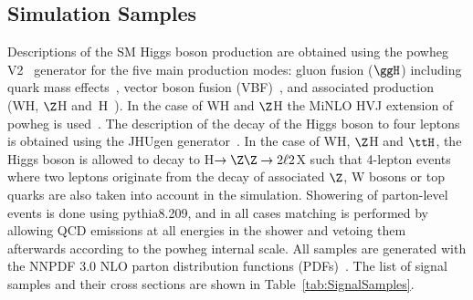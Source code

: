 \subsection{Simulation Samples}
 Descriptions of the SM Higgs boson production are obtained using the {\sc powheg V2}~\cite{Alioli:2008gx,Nason:2004rx,Frixione:2007vw} generator for the
 five main production modes:
gluon fusion ($\ggH$) including quark mass effects~\cite{Bagnaschi:2011tu}, vector boson fusion (VBF)~\cite{Nason:2009ai}, and associated production
(WH, $\Z$H and \ttbar$\,$H~\cite{Hartanto:2015uka}). In the case of WH and $\Z$H the {\sc MiNLO HVJ}
extension of {\sc powheg} is used~\cite{Luisoni:2013kna}. The description of the decay of the Higgs boson to four leptons is obtained using the
{\sc JHUgen} generator~\cite{Gao:2010qx}. In the case of WH, $\Z$H and $\ttH$, the Higgs boson is allowed
to decay to H$\to \Z \Z \to 2\ell2$X such that 4-lepton events where two leptons originate from the decay of associated $\Z$, W bosons or top
quarks are also taken into account in the simulation. Showering of parton-level events is
done using {\sc pythia8.209}, and in all cases matching is performed by allowing QCD emissions at all energies in the shower and vetoing them afterwards
according to the {\sc powheg} internal scale. All samples are generated with
the NNPDF 3.0 NLO parton distribution functions (PDFs)~\cite{Ball:2014uwa}. The list of signal samples and their cross sections are shown in 
Table~\ref{tab:SignalSamples}.

